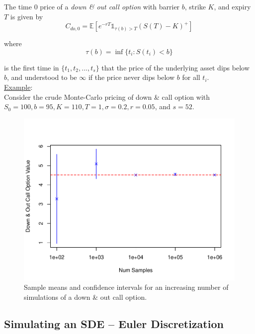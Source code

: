 \documentclass[12pt]{article}
\newlength\tindent
\renewcommand{\indent}{\hspace*{\tindent}}
\begin{document}
\indent The time 0 price of a {\em down \& out call option} with barrier $b$, strike $K$, and expiry $T$ is given by
\begin{equation*}
	C_{do,0} = \mathbb E[e^{-rT}\mathds{1}_{\tau (b) > T}(S(T) - K)^+]
\end{equation*}

where 
\begin{equation*}
	\tau (b) = \inf\{t_i: S(t_i) < b\}
\end{equation*}

is the first time in $\{t_1, t_2, ... , t_s\}$ that the price of the underlying asset dips below $b$, and understood to be $\infty$ if the price never dips below $b$ for all $t_i$. \\

\underline{Example}: \\

\indent Consider the crude Monte-Carlo pricing of down \& call option with $S_0 = 100, b = 95, K = 110, T = 1, \sigma = 0.2, r = 0.05$, and $s = 52$.

\begin{figure}[H]
	\centering
 	\includegraphics{./plots/d_o_callapprox.pdf}
\caption{Sample means and confidence intervals for an increasing number of simulations of a down \& out call option.}
\end{figure}

\subsection{Simulating an SDE -- Euler Discretization}
\end{document}
